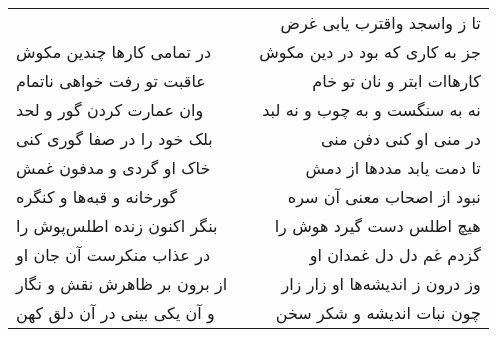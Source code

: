 \begin{center}
\begin{longtable}{l p{0.5cm} r}
&&
تا ز واسجد واقترب یابی غرض
\\
در تمامی کارها چندین مکوش
&&
جز به کاری که بود در دین مکوش
\\
عاقبت تو رفت خواهی ناتمام
&&
کارهاات ابتر و نان تو خام
\\
وان عمارت کردن گور و لحد
&&
نه به سنگست و به چوب و نه لبد
\\
بلک خود را در صفا گوری کنی
&&
در منی او کنی دفن منی
\\
خاک او گردی و مدفون غمش
&&
تا دمت یابد مددها از دمش
\\
گورخانه و قبه‌ها و کنگره
&&
نبود از اصحاب معنی آن سره
\\
بنگر اکنون زنده اطلس‌پوش را
&&
هیچ اطلس دست گیرد هوش را
\\
در عذاب منکرست آن جان او
&&
گزدم غم دل دل غمدان او
\\
از برون بر ظاهرش نقش و نگار
&&
وز درون ز اندیشه‌ها او زار زار
\\
و آن یکی بینی در آن دلق کهن
&&
چون نبات اندیشه و شکر سخن
\\
\end{longtable}
\end{center}
